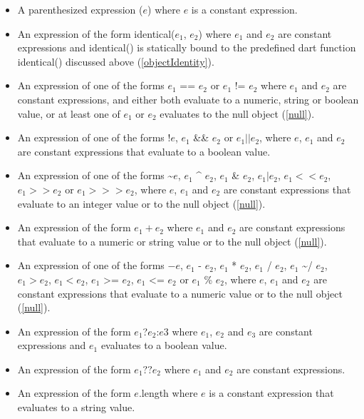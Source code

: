 \documentclass{article}
\newcommand{\code}[1]{{\sf #1}}
\begin{document}
\begin{itemize}
\item A parenthesized expression \code{($e$)} where $e$ is a constant expression.
\item An expression of the form \code{identical($e_1$, $e_2$)} where $e_1$ and $e_2$ are constant expressions  and \code{identical()} is statically bound to the predefined dart function   \code{identical()} discussed above (\ref{objectIdentity}).
\item An expression of one of the forms  \code{$e_1$ == $e_2$} or  \code{$e_1$ != $e_2$} where $e_1$ and $e_2$ are constant expressions, and either both evaluate to a numeric, string or boolean value, or at least one of $e_1$ or $e_2$ evaluates to the null object (\ref{null}).
\item An expression of one of the forms \code{!$e$}, \code{$e_1$ \&\& $e_2$} or \code{$e_1 || e_2$}, where  $e$, $e_1$ and $e_2$ are constant expressions that evaluate to a boolean value.
\item An expression of one of the forms \~{}$e$, $e_1$ \^{} $e_2$, \code{$e_1$ \& $e_2$}, $e_1 | e_2$, $e_1 << e_2$, $e_1 >> e_2$ or $e_1 >>> e_2$, where  $e$, $e_1$ and $e_2$ are constant expressions that evaluate to an integer value or to the null object (\ref{null}).
\item An expression of the form \code{$e_1 + e_2$} where $e_1$ and $e_2$ are constant expressions that evaluate to a numeric or string value or to the null object (\ref{null}).
\item An expression of one of the forms \code{$-e$}, \code{$e_1$ - $e_2$}, \code{$e_1$ * $e_2$}, \code{$e_1$ / $e_2$,} \code{$e_1$ \~{}/ $e_2$},  \code{$e_1  >  e_2$}, \code{$e_1  <  e_2$}, \code{$e_1$ >= $e_2$}, \code{$e_1$ <= $e_2$} or \code{$e_1$ \% $e_2$},  where $e$, $e_1$ and $e_2$ are constant expressions that evaluate to a numeric value or to the null object (\ref{null}).
\item An expression of the form \code{$e_1$?$e_2$:$e3$} where $e_1$, $e_2$ and $e_3$ are constant expressions and $e_1$ evaluates to a boolean value.
\item An expression of the form \code{$e_1 ?? e_2$} where $e_1$ and $e_2$ are constant expressions.
\item An expression of the form \code{$e$.length} where $e$ is a constant expression that evaluates to a string value.
\end{itemize}


\end{document}

